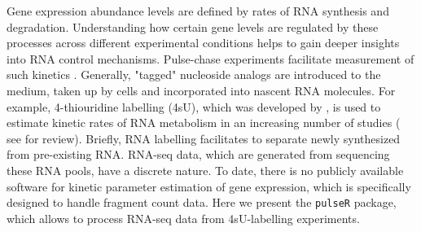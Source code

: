 Gene expression abundance levels are defined by rates of RNA synthesis and degradation.
Understanding how certain gene levels are regulated by these processes across different
experimental conditions helps to gain deeper insights into RNA control mechanisms.
Pulse-chase experiments facilitate measurement of  such kinetics \citep{Wachutka2016}. 
Generally, "tagged" nucleoside analogs are introduced to the medium, 
taken up by cells and incorporated into nascent RNA molecules.
For example, 4-thiouridine labelling (4sU), which was developed by \cite{dolken2008high}, is used to estimate 
kinetic rates of RNA metabolism in an increasing number of studies ( 
see \cite{Wachutka2016} for review). Briefly, RNA labelling facilitates to separate newly synthesized from pre-existing RNA.
RNA-seq data, which are generated from sequencing these RNA pools, have a discrete nature.
To date, there is no publicly available software for kinetic parameter estimation of gene expression, which is specifically designed to handle 
fragment count data. Here we present the \verb|pulseR| package, which allows to 
process RNA-seq data from 4sU-labelling experiments.

